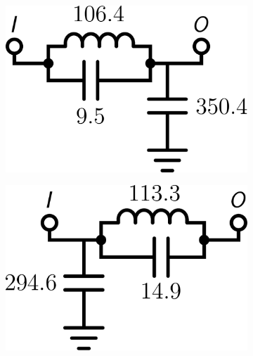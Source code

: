 \begin{figure}
\centering

\begin{subfigure}[t]{0.16\textwidth}
\centering
\includegraphics[scale = 0.14]{../ch6/figures/lpf1_circuit1}
\caption{\label{fig:lpf1_circuita}}
\end{subfigure}%
\begin{subfigure}[t]{0.16\textwidth}
\centering
\includegraphics[scale = 0.14]{../ch6/figures/lpf1_circuit2}
\caption{\label{fig:lpf1_circuitb}}
\end{subfigure}%
\begin{subfigure}[t]{0.16\textwidth}
\centering

\end{subfigure}
\end{figure}
